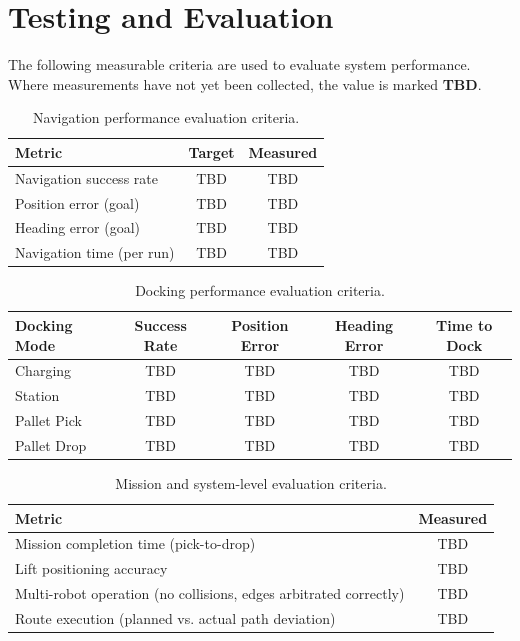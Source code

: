 \documentclass[a4paper, 12pt]{article}
\begin{document}
\section{Testing and Evaluation}
\label{sec:testing}

The following measurable criteria are used to evaluate system
performance. Where measurements have not yet been collected, the value
is marked \textbf{TBD}.

\begin{table}[H]
\centering
\caption{Navigation performance evaluation criteria.}
\label{tab:eval-navigation}
\begin{tabular}{lcc}
\toprule
\textbf{Metric} & \textbf{Target} & \textbf{Measured} \\
\midrule
Navigation success rate & TBD & TBD \\
Position error (goal) & TBD & TBD \\
Heading error (goal) & TBD & TBD \\
Navigation time (per run) & TBD & TBD \\
\bottomrule
\end{tabular}
\end{table}

\begin{table}[H]
\centering
\caption{Docking performance evaluation criteria.}
\label{tab:eval-docking}
\begin{tabular}{lcccc}
\toprule
\textbf{Docking Mode} & \textbf{Success Rate} & \textbf{Position Error} & \textbf{Heading Error} & \textbf{Time to Dock} \\
\midrule
Charging     & TBD & TBD & TBD & TBD \\
Station      & TBD & TBD & TBD & TBD \\
Pallet Pick  & TBD & TBD & TBD & TBD \\
Pallet Drop  & TBD & TBD & TBD & TBD \\
\bottomrule
\end{tabular}
\end{table}

\begin{table}[H]
\centering
\caption{Mission and system-level evaluation criteria.}
\label{tab:eval-mission}
\begin{tabular}{lc}
\toprule
\textbf{Metric} & \textbf{Measured} \\
\midrule
Mission completion time (pick-to-drop) & TBD \\
Lift positioning accuracy & TBD \\
Multi-robot operation (no collisions, edges arbitrated correctly) & TBD \\
Route execution (planned vs. actual path deviation) & TBD \\
\bottomrule
\end{tabular}
\end{table}
\end{document}
